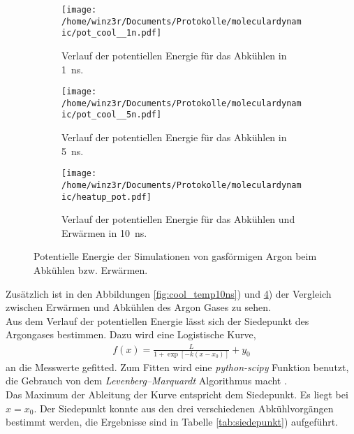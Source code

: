 \begin{figure}
  \centering
  \vspace{-0.3cm}
  \begin{subfigure}[h]{0.45\textwidth}
    \centering
    \texttt{[image: /home/winz3r/Documents/Protokolle/moleculardynamic/pot\_cool\_\_1n.pdf]}
    \caption{\centering Verlauf der potentiellen Energie für das Abkühlen in 1~ns.}\label{fig:cool_pot1ns}
  \end{subfigure}
  \vspace{0.25cm}
  \centering
  \begin{subfigure}[h]{0.45\textwidth}
    \centering
    \texttt{[image: /home/winz3r/Documents/Protokolle/moleculardynamic/pot\_cool\_\_5n.pdf]}
    \caption{\centering Verlauf der potentiellen Energie für das Abkühlen in 5~ns.}\label{fig:cool_pot5ns}
  \end{subfigure}
  \vspace{0.25cm}
  \centering
  \begin{subfigure}{\textwidth}
    \centering
    \texttt{[image: /home/winz3r/Documents/Protokolle/moleculardynamic/heatup\_pot.pdf]}
    \caption{Verlauf der potentiellen Energie für das Abkühlen und Erwärmen in 10~ns.}\label{fig:cool_pot10ns}
  \end{subfigure}
  \caption{Potentielle Energie der Simulationen von gasförmigen Argon beim Abkühlen bzw. Erwärmen.}
\end{figure}
Zusätzlich ist in den Abbildungen \ref{fig:cool_temp10ns}) und \ref{fig:cool_pot10ns}) der Vergleich zwischen Erwärmen und Abkühlen des Argon Gases zu sehen.
\\ \noindent
Aus dem Verlauf der potentiellen Energie lässt sich der Siedepunkt des Argongases bestimmen. Dazu wird eine Logistische Kurve,
\begin{align}
f(x)=\frac{L}{1+\exp\left[ -k \left(x-x_0\right)\right]} + y_0
\end{align}
an die Messwerte gefitted.
Zum Fitten wird eine \emph{python-scipy} Funktion benutzt, die Gebrauch von dem \emph{Levenberg–Marquardt} Algorithmus macht \cite{leastsquares}.
\\ \noindent
Das Maximum der Ableitung der Kurve entspricht dem Siedepunkt. Es liegt bei $x = x_0$.
Der Siedepunkt konnte aus den drei verschiedenen Abkühlvorgängen bestimmt werden, die Ergebnisse sind in Tabelle \ref{tab:siedepunkt}) aufgeführt.

